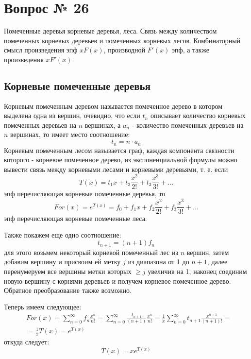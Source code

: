 \chapter{Вопрос № 26}

Помеченные деревья корневые деревья, леса. Связь между количеством помеченных корневых деревьев и помеченных корневых лесов. Комбинаторный смысл произведения эпф $xF\left(x\right)$, производной $F'\left(x\right)$ эпф, а также произведения $xF'\left(x\right)$.

\section{Корневые помеченные деревья}

Корневым помеченным деревом называется помеченное дерево в котором выделена одна из вершин, очевидно, что если $t_n$ описывает количество корневых помеченных деревьев на $n$ вершинах, а $a_n$ - количество помеченных деревьев на $n$ вершинах, то имеет место соотношение:
\begin{equation}
	t_n = n \cdot a_n
\end{equation}
Корневым помеченным лесом называется граф, каждая компонента связности которого - корневое помеченное дерево, из экспоненциальной формулы можно вывести связь между корневыми лесами и корневыми деревьями, т. е. если
\[
	T\left(x\right) = t_1 x + t_2 \frac{x^2}{2!} + t_3 \frac{x^3}{3!} + ...
\]
эпф перечисляющая корневые помеченные деревья, то
\[
	For\left(x\right) = e^{T\left(x\right)} = f_0 + f_1x + f_2\frac{x^2}{2!} + f_3\frac{x^3}{3!} + ...
\]
эпф перечисляющая корневые помеченные леса.

Также покажем еще одно соотношение:
\begin{equation}
	t_{n+1} = \left(n+1\right) f_n
\end{equation}
для этого возьмем некоторый корневой помеченный лес из $n$ вершин, затем добавим вершину и присвоим ей метку $j$ из диапазона от 1 до $n+1$, далее перенумеруем все вершины метки которых $\ge j$ увеличив на 1, наконец соединим новую вершину с корнями деревьев и получем корневое помеченное дерево. Обратное преобразование также возможно.

Теперь имеем следующее:
\[
	\begin{split}
		& For\left(x\right) = \sum_{n=0}^\infty f_n \frac{x^n}{n!} = \sum_{n=0}^\infty \frac{t_{n+1}}{\left(n+1\right)} \frac{x^n}{n!} = \frac{1}{x}\sum_{n=0}^\infty t_{n+1} \frac{x^{n+1}}{\left(n+1\right)!} = \\
		& = \frac{1}{x} T\left(x\right) = e^{T\left(x\right)}
	\end{split}
\]
откуда следует:
\[
	T\left(x\right) = x e^{T\left(x\right)}
\]

